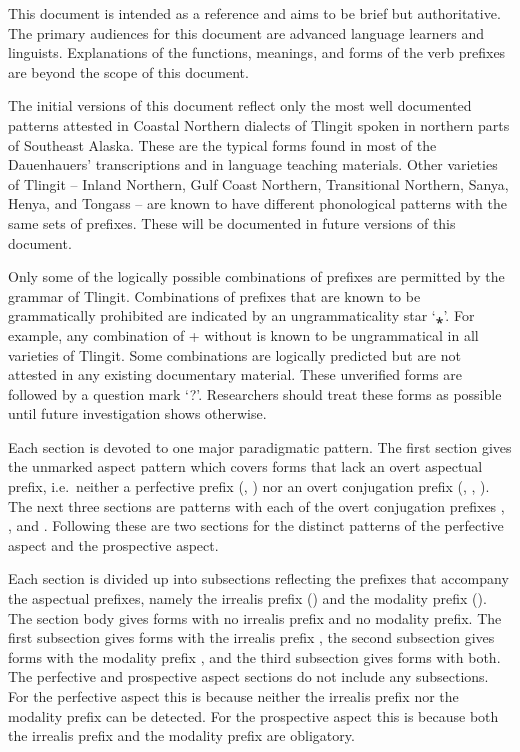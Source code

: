 \documentclass[12pt,letterpaper,landscape,oneside,article]{memoir}
\begin{document}
\begin{multicols}{2}
This document is intended as a reference and aims to be brief but authoritative.
The primary audiences for this document are advanced language learners and linguists.
Explanations of the functions, meanings, and forms of the verb prefixes are beyond the scope of this document.

The initial versions of this document reflect only the most well documented patterns attested in Coastal Northern dialects of Tlingit spoken in northern parts of Southeast Alaska.
These are the typical forms found in most of the Dauenhauers’ transcriptions and in language teaching materials.
Other varieties of Tlingit – Inland Northern, Gulf Coast Northern, Transitional Northern, Sanya, Henya, and Tongass – are known to have different phonological patterns with the same sets of prefixes.
These will be documented in future versions of this document.

Only some of the logically possible combinations of prefixes are permitted by the grammar of Tlingit.
Combinations of prefixes that are known to be grammatically prohibited are indicated by an ungrammaticality star ‘⁎’.
For example, any combination of  +  without  is known to be ungrammatical in all varieties of Tlingit.
Some combinations are logically predicted but are not attested in any existing documentary material.
These unverified forms are followed by a question mark ‘?’.
Researchers should treat these forms as possible until future investigation shows otherwise.

Each section is devoted to one major paradigmatic pattern.
The first section gives the unmarked aspect pattern which covers forms that lack an overt aspectual prefix, i.e.\ neither a perfective prefix (, ) nor an overt conjugation prefix (, , ).
The next three sections are patterns with each of the overt conjugation prefixes , , and .
Following these are two sections for the distinct patterns of the perfective aspect and the prospective aspect.

Each section is divided up into subsections reflecting the prefixes that accompany the aspectual prefixes, namely the irrealis prefix () and the modality prefix ().
The section body gives forms with no irrealis prefix and no modality prefix.
The first subsection gives forms with the irrealis prefix , the second subsection gives forms with the modality prefix , and the third subsection gives forms with both.
The perfective and prospective aspect sections do not include any subsections.
For the perfective aspect this is because neither the irrealis prefix nor the modality prefix can be detected.
For the prospective aspect this is because both the irrealis prefix  and the modality prefix  are obligatory.


\end{multicols}
\end{document}
